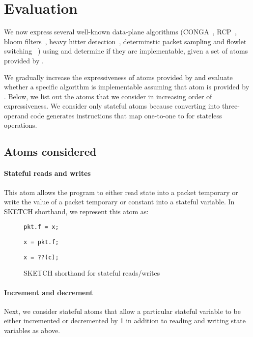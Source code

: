 \section{Evaluation}
\label{s:eval}
We now express several well-known data-plane algorithms (CONGA~\cite{conga},
RCP~\cite{rcp}, bloom filters~\cite{bloom}, heavy hitter
detection~\cite{opensketch}, determinstic packet sampling and flowlet switching
~\cite{flowlets}) using \pktlanguage and determine if they are implementable,
given a set of atoms provided by \absmachine.

We gradually increase the expressiveness of atoms provided by \pktlanguage and
evaluate whether a specific algorithm is implementable assuming that atom is
provided by \absmachine. Below, we list out the atoms that we consider in
increasing order of expressiveness. We consider only stateful atoms because
converting into three-operand code generates instructions that map one-to-one
to \absmachine for stateless operations.

\subsection{Atoms considered}
\paragraph{Stateful reads and writes}
This atom allows the program to either read state into a packet temporary or write the
value of a packet temporary or constant into a stateful variable. In SKETCH shorthand,
we represent this atom as:
\begin{figure}
\begin{lstlisting}[style=customc]
pkt.f = x;
\end{lstlisting}
\begin{lstlisting}[style=customc]
x = pkt.f;
\end{lstlisting}
\begin{lstlisting}[style=customc]
x = ??(c);
\end{lstlisting}
\caption{SKETCH shorthand for stateful reads/writes}
\label{fig:read/write}
\end{figure}

\paragraph{Increment and decrement}
Next, we consider stateful atoms that allow a particular stateful variable to
be either incremented or decremented by 1 in addition to reading and writing
state variables as above.

